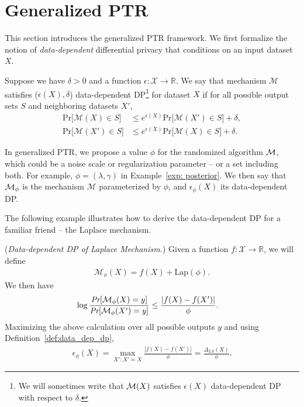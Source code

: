 \section{Generalized PTR}
\label{sec:gen_ptr}
This section introduces the generalized PTR framework. We first formalize the notion of \emph{data-dependent} differential privacy that conditions on an input dataset $X$. 

\begin{definition}
\label{def:data_dep_dp}
Suppose we have $\delta > 0$ and a function $\epsilon: \mathcal{X} \rightarrow \mathbb{R}$. We say that mechanism $\mathcal{M}$ satisfies ($\epsilon(X), \delta$) data-dependent DP\footnote{We will sometimes write that $\mathcal{M}(X)$ satisfies $\epsilon(X)$ data-dependent DP with respect to $\delta$.} for dataset $X$ if for all possible output sets $S$ and neighboring datasets $X'$,
\begin{align*}
    \text{Pr}\big[\mathcal{M}(X) \in S\big] &\leq e^{\epsilon(X)}\text{Pr}\big[\mathcal{M}(X') \in S\big] + \delta, \\
       \text{Pr}\big[\mathcal{M}(X') \in S\big] &\leq e^{\epsilon(X)}\text{Pr}\big[\mathcal{M}(X) \in S\big] + \delta.
\end{align*}
\end{definition}

In generalized PTR, we propose a value $\phi$ for the randomized algorithm $\mathcal{M}$, which could be a noise scale or regularization parameter -- or a set including both. For example, $\phi = (\lambda, \gamma)$ in Example~\ref{exp: posterior}. We then say that $\mathcal{M}_{\phi}$ is the mechanism $\mathcal{M}$ parameterized by $\phi$, and $\epsilon_{\phi}(X)$ its data-dependent DP.

The following example illustrates how to derive the data-dependent DP for a familiar friend -- the Laplace mechanism.

\begin{example}(\emph{Data-dependent DP of Laplace Mechanism.}) \label{examp:lap_mech}
Given a function $f: \mathcal{X} \rightarrow \mathbb{R}$, we will define
\begin{align*}
    \mathcal{M}_{\phi}(X) = f(X) + \text{Lap}\left(\phi\right).
\end{align*}
We then have
\begin{align*}
    \log \dfrac{\emph{Pr}[\mathcal{M}_{\phi}(X) = y]}{\emph{Pr}[\mathcal{M}_{\phi}(X') = y]} &\leq \dfrac{|f(X) - f(X')|}{\phi}.
\end{align*}
Maximizing the above calculation over all possible outputs $y$ and using Definition~\ref{def:data_dep_dp},
\begin{align*}
    \epsilon_{\phi}(X) = \max\limits_{X': X' \simeq X} \frac{|f(X) - f(X')|}{\phi} = \frac{\Delta_{LS}(X)}{\phi}.
\end{align*}
\end{example}


